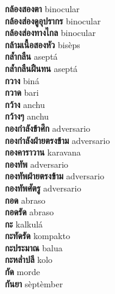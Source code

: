 \textbf{ กล้องสองตา  } binocular \\
\textbf{ กล้องส่องดูอุปรากร  } binocular \\
\textbf{ กล้องส่องทางไกล  } binocular \\
\textbf{ กล้ามเนื้อสองหัว  } bisèps \\
\textbf{ กล้ำกลืน  } aseptá \\
\textbf{ กล้ำกลืนฝืนทน  } aseptá \\
\textbf{ กวาง  } biná \\
\textbf{ กวาด  } bari \\
\textbf{ กว้าง  } anchu \\
\textbf{ กว้างๆ  } anchu \\
\textbf{ กองกำลังข้าศึก  } adversario \\
\textbf{ กองกำลังฝ่ายตรงข้าม  } adversario \\
\textbf{ กองคาราวาน  } karavana \\
\textbf{ กองทัพ  } adversario \\
\textbf{ กองทัพฝ่ายตรงข้าม  } adversario \\
\textbf{ กองทัพศัตรู  } adversario \\
\textbf{ กอด  } abraso \\
\textbf{ กอดรัด  } abraso \\
\textbf{ กะ  } kalkulá \\
\textbf{ กะทัดรัด  } kompakto \\
\textbf{ กะประมาณ  } balua \\
\textbf{ กะหล่ำปลี  } kolo \\
\textbf{ กัด  } morde \\
\textbf{ กันยา  } sèptèmber \\
